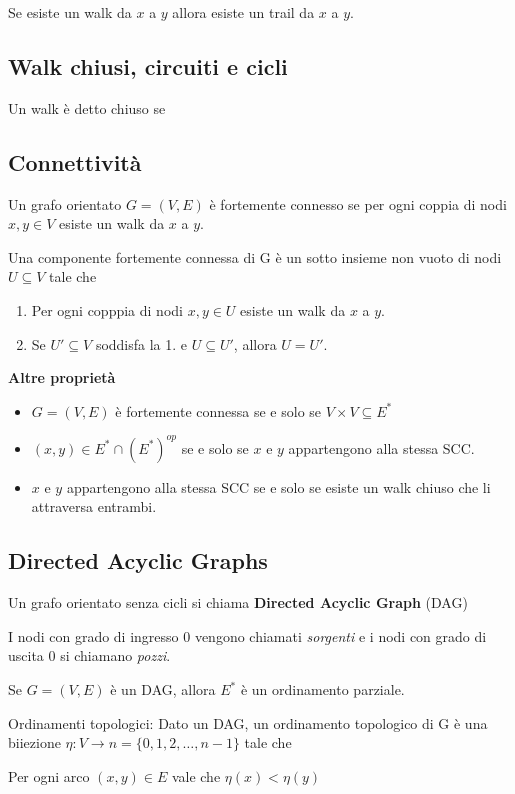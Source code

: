 \documentclass{article}
\begin{document}
Se esiste un walk da \(x\) a \(y\) allora esiste un trail da \(x\) a \(y\).

\subsection{Walk chiusi, circuiti e cicli}
Un walk è detto chiuso se 

\subsection{Connettività}
Un grafo orientato \(G = (V,E)\) è fortemente connesso se per ogni coppia di nodi \(x,y \in V\) esiste un walk da \(x\) a \(y\).

Una componente fortemente connessa di G è un sotto insieme non vuoto di nodi \(U \subseteq V\) tale che
\begin{enumerate}
    \item Per ogni copppia di nodi \(x, y \in U\) esiste un walk da \(x\) a \(y\).
    \item Se \(U' \subseteq V\) soddisfa la 1. e \(U \subseteq U'\), allora \(U = U'\).
\end{enumerate}

\textbf{Altre proprietà}
\begin{itemize}
    \item \(G = (V,E)\) è fortemente connessa se e solo se \(V \times V \subseteq E^*\)
    \item \((x,y) \in E^* \cap (E^*)^{op}\) se e solo se \(x\) e \(y\) appartengono alla stessa SCC.
    \item \(x\) e \(y\) appartengono alla stessa SCC se e solo se esiste un walk chiuso che li attraversa entrambi.
\end{itemize}

\subsection{Directed Acyclic Graphs}
Un grafo orientato senza cicli si chiama \textbf{Directed Acyclic Graph} (DAG)

I nodi con grado di ingresso 0 vengono chiamati \emph{sorgenti} e i nodi con grado di uscita 0 si chiamano \emph{pozzi}.

Se \(G = (V,E)\) è un DAG, allora \(E^*\) è un ordinamento parziale.

\begin{dfn}{Ordinamenti topologici:}
    Dato un DAG, un ordinamento topologico di G è una biiezione \(\eta: V \rightarrow n = \{0,1,2,\ldots,n-1\}\) tale che
    \begin{center}
        Per ogni arco \((x,y) \in E\) vale che \(\eta(x) < \eta(y)\)
    \end{center}
\end{dfn}
\end{document}
